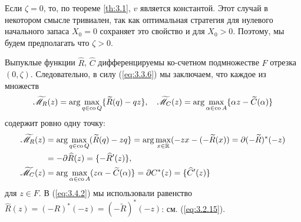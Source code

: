 Если $\zeta=0$, то, по теореме \ref{th:3.1}, $v$ является константой. Этот случай в некотором смысле тривиален, так как оптимальная стратегия для нулевого начального запаса $X_0=0$ сохраняет это свойство и для $X_0>0$. Поэтому, мы будем предполагать что $\zeta>0$.

Выпуклые функции $\widehat R$, $\widehat C$ дифференцируемы ко-счетном подмножестве $F$ отрезка $(0,\zeta)$. Следовательно, в силу (\ref{eq:3.3.6}) мы заключаем, что каждое из множеств
$$ \widetilde{\mathscr M}_R(z)=\arg\max_{q\in {\rm co\,} Q} \{\widetilde R(q)-qz\},\quad
   \widetilde{\mathscr M}_C(z)=\arg\max_{\alpha\in{\rm co\,} A}\{\alpha z-\widetilde C(\alpha)\}$$
содержит ровно одну точку:
\begin{align}
\widetilde{\mathscr M}_R(z)&=\arg\max_{q\in {\rm co\,} Q}(\widetilde R(q)-zq\}=\arg\max_{x\in\mathbb R}(-zx-(-\widetilde R(x))=\partial (-\widetilde R)^*(-z)\nonumber\\
&=-\partial\widehat R(z)=\{-\widehat R'(z)\},\label{eq:3.4.2}\\
\widetilde{\mathscr M}_C(z)&=\arg\max_{\alpha\in {\rm co\,} A}(z\alpha-\widetilde C(\alpha)\}=\partial C^*(z)=\{\widehat C'(z)\}\nonumber
\end{align}
для $z\in F$. В (\ref{eq:3.4.2}) мы использовали равенство $\widehat R(z)=(-R)^*(-z)=(-\widetilde R)^*(-z)$: см. (\ref{eq:3.2.15}).

